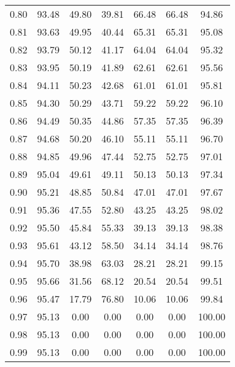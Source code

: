 \begin{tabular}{|c|c|c|c|c|c|c|}
      0.80 &     93.48 &     49.80 &      39.81 &   66.48 &      66.48 &         94.86 \\
      0.81 &     93.63 &     49.95 &      40.44 &   65.31 &      65.31 &         95.08 \\
      0.82 &     93.79 &     50.12 &      41.17 &   64.04 &      64.04 &         95.32 \\
      0.83 &     93.95 &     50.19 &      41.89 &   62.61 &      62.61 &         95.56 \\
      0.84 &     94.11 &     50.23 &      42.68 &   61.01 &      61.01 &         95.81 \\
      0.85 &     94.30 &     50.29 &      43.71 &   59.22 &      59.22 &         96.10 \\
      0.86 &     94.49 &     50.35 &      44.86 &   57.35 &      57.35 &         96.39 \\
      0.87 &     94.68 &     50.20 &      46.10 &   55.11 &      55.11 &         96.70 \\
      0.88 &     94.85 &     49.96 &      47.44 &   52.75 &      52.75 &         97.01 \\
      0.89 &     95.04 &     49.61 &      49.11 &   50.13 &      50.13 &         97.34 \\
      0.90 &     95.21 &     48.85 &      50.84 &   47.01 &      47.01 &         97.67 \\
      0.91 &     95.36 &     47.55 &      52.80 &   43.25 &      43.25 &         98.02 \\
      0.92 &     95.50 &     45.84 &      55.33 &   39.13 &      39.13 &         98.38 \\
      0.93 &     95.61 &     43.12 &      58.50 &   34.14 &      34.14 &         98.76 \\
      0.94 &     95.70 &     38.98 &      63.03 &   28.21 &      28.21 &         99.15 \\
      0.95 &     95.66 &     31.56 &      68.12 &   20.54 &      20.54 &         99.51 \\
      0.96 &     95.47 &     17.79 &      76.80 &   10.06 &      10.06 &         99.84 \\
      0.97 &     95.13 &      0.00 &       0.00 &    0.00 &       0.00 &        100.00 \\
      0.98 &     95.13 &      0.00 &       0.00 &    0.00 &       0.00 &        100.00 \\
      0.99 &     95.13 &      0.00 &       0.00 &    0.00 &       0.00 &        100.00 \\
\bottomrule
\end{tabular}
